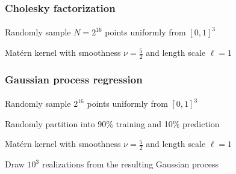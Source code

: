 \documentclass{beamer}                             %
\newenvironment{wideitemize}
  {\itemize\setlength{\itemsep}{0.5cm}}
  {\enditemize}
\begin{document}
\begin{frame}
\frametitle{Cholesky factorization}
\framesubtitle{}

\begin{wideitemize}
  \item Randomly sample \( N = 2^{16} \) points uniformly from \( [0, 1]^3 \)
  \item Mat{\'e}rn kernel with smoothness \( \nu =
    \frac{5}{2} \) and length scale \( \ell = 1 \)
\end{wideitemize}



\begin{figure}[t]
  \centering
  
\end{figure}
\end{frame}

\begin{frame}
\frametitle{Gaussian process regression}
\framesubtitle{}

\begin{wideitemize}
  \item Randomly sample \( 2^{16} \) points uniformly from \( [0, 1]^3 \)
  \item Randomly partition into 90\% training and 10\% prediction
  \item Mat{\'e}rn kernel with smoothness \( \nu =
    \frac{5}{2} \) and length scale \( \ell = 1 \)
  \item Draw \( 10^3 \) realizations from the resulting Gaussian process
\end{wideitemize}


\begin{figure}[t]
  \centering
  
  \label{fig:gp_rho}
\end{figure}
\end{frame}
\end{document}
